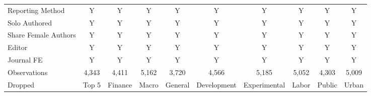 \begin{tabular}{l*{9}{c}}
Reporting Method &        Y&        Y&        Y&        Y&        Y&        Y&        Y&        Y&        Y\\
Solo Authored   &        Y&        Y&        Y&        Y&        Y&        Y&        Y&        Y&        Y\\
Share Female Authors &        Y&        Y&        Y&        Y&        Y&        Y&        Y&        Y&        Y\\
Editor          &        Y&        Y&        Y&        Y&        Y&        Y&        Y&        Y&        Y\\
Journal FE      &        Y&        Y&        Y&        Y&        Y&        Y&        Y&        Y&        Y\\
\hline
Observations    &    4,343&    4,411&    5,162&    3,720&    4,566&    5,185&    5,052&    4,303&    5,009\\
Dropped         &    Top 5&  Finance&    Macro&  General&Development&Experimental&    Labor&   Public&    Urban\\
\hline\hline
\end{tabular}
